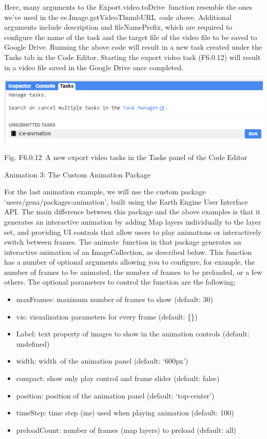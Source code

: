 \documentclass[
  letterpaper,
  DIV=11,
  numbers=noendperiod]{scrreprt}
\providecommand{\tightlist}{%
  \setlength{\itemsep}{0pt}\setlength{\parskip}{0pt}}\usepackage{longtable,booktabs,array}
\begin{document}
Here, many arguments to the Export.video.toDrive~function resemble the
ones we've used in the ee.Image.getVideoThumbURL~code above. Additional
arguments include description and fileNamePrefix, which are required to
configure the name of the task and the target file of the video file to
be saved to Google Drive. Running the above code will result in a new
task created under the Tasks tab in the Code Editor. Starting the export
video task (F6.0.12) will result in a video file saved in the Google
Drive once completed.

\includegraphics{./F6/image9.png}

Fig. F6.0.12~A new export video tasks in the Tasks panel of the Code
Editor

Animation 3: The Custom Animation Package

For the last animation example, we will use the custom package
`users/gena/packages:animation', built using the Earth Engine User
Interface API. The main difference between this package and the above
examples is that it generates an interactive animation by adding Map
layers individually to the layer set, and providing UI controls that
allow users to play animations or interactively switch between frames.
The animate~function in that package generates an interactive animation
of an ImageCollection, as described below. This function has a number of
optional arguments allowing you to configure, for example, the number of
frames to be animated, the number of frames to be preloaded, or a few
others. The optional parameters to control the function are the
following:

\begin{itemize}
\tightlist
\item
  maxFrames: maximum number of frames to show (default: 30)
\item
  vis: visualization parameters for every frame (default: \{\})
\item
  Label: text property of images to show in the animation controls
  (default: undefined)
\item
  width: width~of the animation panel (default: `600px')
\item
  compact: show only play control and frame slider (default: false)
\item
  position: position of the animation panel (default: `top-center')
\item
  timeStep: time step (ms) used when playing animation (default: 100)
\item
  preloadCount: number of frames (map layers) to preload (default: all)
\end{itemize}
\end{document}
